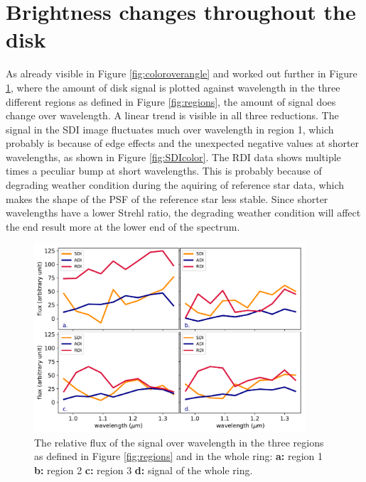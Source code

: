 \documentclass[twoside,single,12pt]{lion-msc}
\begin{document}
\section{Brightness changes throughout the disk}
As already visible in Figure \ref{fig:coloroverangle} and worked out further in Figure \ref{fig:coloroverpos}, where the amount of disk signal is plotted against wavelength in the three different regions as defined in Figure \ref{fig:regions}, the amount of signal does change over wavelength. A linear trend is visible in all three reductions. The signal in the SDI image fluctuates much over wavelength in region 1, which probably is because of edge effects and the unexpected negative values at shorter wavelengths, as shown in Figure \ref{fig:SDIcolor}. The RDI data shows multiple times a peculiar bump at short wavelengths. This is probably because of degrading weather condition during the aquiring of reference star data, which makes the shape of the PSF of the reference star less stable. Since shorter wavelengths have a lower Strehl ratio, the degrading weather condition will affect the end result more at the lower end of the spectrum.
\bigskip

\begin{figure}[!t]
\centering
\vspace{-0.3cm}
\includegraphics[trim={0cm 0cm 0cm 0cm},clip,width = 0.9\textwidth]{colorregions}
\caption{The relative flux of the signal over wavelength in the three regions as defined in Figure \ref{fig:regions} and in the whole ring: \textbf{a:} region 1 \textbf{b:} region 2 \textbf{c:} region 3 \textbf{d:} signal of the whole ring.}
\label{fig:coloroverpos}
\vspace{-0.5cm}
\end{figure}
\end{document}
